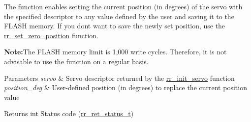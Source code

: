 The function enables setting the current position (in degrees) of the servo with the specified descriptor to any value defined by the user and saving it to the F\+L\+A\+SH memory. If you don\textquotesingle{}t want to save the newly set position, use the \hyperlink{group___config_gab68e78b8a0d2a9ac38b9a72d78acab85}{rr\+\_\+set\+\_\+zero\+\_\+position} function.~\newline
 

{\bfseries Note\+:}The F\+L\+A\+SH memory limit is 1,000 write cycles. Therefore, it is not advisable to use the function on a regular basis.


\begin{DoxyParams}{Parameters}
{\em servo} & Servo descriptor returned by the \hyperlink{group___init_ga0adb313a3eeb8a4399431e940a1f3e9e}{rr\+\_\+init\+\_\+servo} function \\
\hline
{\em position\+\_\+deg} & User-\/defined position (in degrees) to replace the current position value \\
\hline
\end{DoxyParams}
\begin{DoxyReturn}{Returns}
int Status code (\hyperlink{api_8h_a92d5be5038abcf89837faf85a08debdc}{rr\+\_\+ret\+\_\+status\+\_\+t}) 
\end{DoxyReturn}
